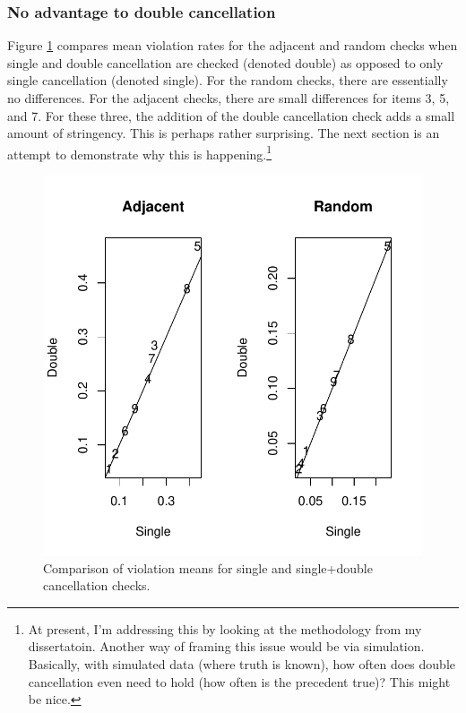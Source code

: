 \documentclass[12pt]{article}
\begin{document}
\subsubsection{No advantage to double cancellation}
Figure \ref{single_example} compares mean violation rates for the adjacent and random checks when single and double cancellation are checked (denoted double) as opposed to only single cancellation (denoted single). For the random checks, there are essentially no differences. For the adjacent checks, there are small differences for items 3, 5, and 7. For these three, the addition of the double cancellation check adds a small amount of stringency. This is perhaps rather surprising. The next section is an attempt to demonstrate why this is happening.\footnote{At present, I'm addressing this by looking at the methodology from my dissertatoin. Another way of framing this issue would be via simulation. Basically, with simulated data (where truth is known), how often does double cancellation even need to hold (how often is the precedent true)? This might be nice.}


\begin{figure}
\centering
\caption{Comparison of violation means for single and single+double cancellation checks.} \label{single_example}
\includegraphics[width=\textwidth]{./figs/single_example}
\end{figure}
\end{document}
